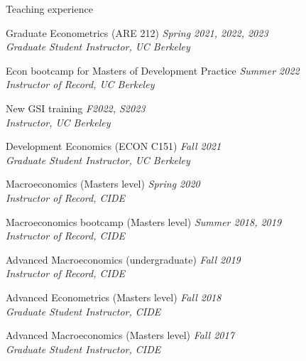 \documentclass{resume} %
\begin{document}
\begin{rSection}{Teaching experience}

\item Graduate Econometrics (ARE 212) \hfill {\em Spring 2021, 2022, 2023} \\
\textit{Graduate Student Instructor, UC Berkeley} \hfill

\item Econ bootcamp for Masters of Development Practice \hfill {\em Summer 2022} \\
\textit{Instructor of Record, UC Berkeley} \hfill

\item New GSI training \hfill {\em F2022, S2023} \\
\textit{Instructor, UC Berkeley} \hfill

\item Development Economics (ECON C151) \hfill {\em Fall 2021} \\
\textit{Graduate Student Instructor, UC Berkeley} \hfill

\item Macroeconomics (Masters level) \hfill {\em Spring 2020} \\
\textit{Instructor of Record, CIDE} \hfill

\item Macroeconomics bootcamp (Masters level) \hfill {\em Summer 2018, 2019} \\
\textit{Instructor of Record, CIDE} \hfill

\item Advanced Macroeconomics (undergraduate) \hfill {\em Fall 2019} \\
\textit{Instructor of Record, CIDE} \hfill

\item Advanced Econometrics (Masters level) \hfill {\em Fall 2018} \\
\textit{Graduate Student Instructor, CIDE} \hfill

\item Advanced Macroeconomics (Masters level) \hfill {\em Fall 2017} \\
\textit{Graduate Student Instructor, CIDE} \hfill


\end{rSection}
\end{document}
